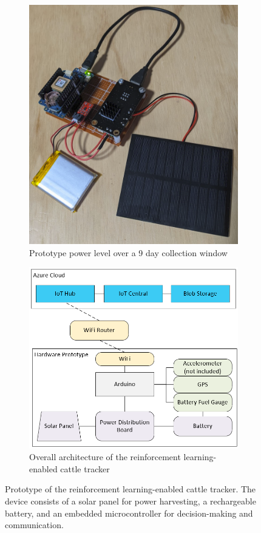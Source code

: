 \documentclass[10pt]{cai}
\begin{document}
\begin{figure}[h]
  \centering
  \begin{subfigure}{0.48\textwidth}
      \centering
      \includegraphics[width=0.75\linewidth]{./figs/prototype.png}
      \caption{Prototype power level over a 9 day collection window}
      \label{fig:prototype_real}
  \end{subfigure}
  \hfill
  \begin{subfigure}{0.48\textwidth}
      \centering
      \includegraphics[width=\linewidth]{figs/prototype_diagram.png}
      \caption{Overall architecture of the reinforcement learning-enabled cattle tracker}
      \label{fig:prototype_diagram}
  \end{subfigure}
  \caption{Prototype of the reinforcement learning-enabled cattle tracker. The device consists of a solar panel for power harvesting, a rechargeable battery, and an embedded microcontroller for decision-making and communication.}
  \label{fig:prototype}
\end{figure}
\end{document}
